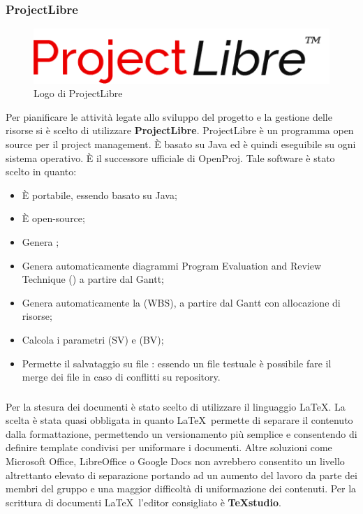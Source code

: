 \documentclass[../NormeDiProgetto.tex]{subfiles}
\begin{document}
			\subsubsection{ProjectLibre}
			\begin{figure} [h!]
				\centering
				\includegraphics[scale=0.3]{./Immagini/Libre.png}
				\caption{Logo di ProjectLibre}\label{}
			\end{figure}
				Per pianificare le attività legate allo sviluppo del progetto e la gestione delle risorse
				si è scelto di utilizzare \textbf{ProjectLibre}.
				ProjectLibre è un programma open source per il project management. È basato su Java ed è
				quindi eseguibile su ogni sistema operativo. È il successore ufficiale di OpenProj. Tale
				software è stato scelto in quanto:
				\begin{itemize}
					\item È portabile, essendo basato su Java;
					\item È open-source;
					\item Genera ;
					\item Genera automaticamente diagrammi Program Evaluation and Review Technique ()
					a partire dal Gantt;
					\item Genera automaticamente la  (WBS), a partire dal Gantt
					con allocazione di risorse;
					\item Calcola i parametri (SV) e  (BV);
					\item Permette il salvataggio su file : essendo un file testuale è possibile
					fare il merge dei file in caso di conflitti su repository. 
				\end{itemize}
			\subsubsection{\gl{\LaTeX}}
				Per la stesura dei documenti è stato scelto di utilizzare il linguaggio \LaTeX.
				La scelta è stata quasi obbligata in quanto \LaTeX\ permette di separare il contenuto dalla
				formattazione, permettendo un versionamento più semplice e consentendo di definire template condivisi per uniformare i documenti. Altre soluzioni come Microsoft Office, LibreOffice o
				Google Docs non avrebbero consentito un livello altrettanto elevato di separazione portando
				ad un aumento del lavoro da parte dei membri del gruppo e una maggior difficoltà di
				uniformazione dei contenuti.
				Per la scrittura di documenti \LaTeX\ l'editor consigliato è \textbf{TeXstudio}.
\end{document}
